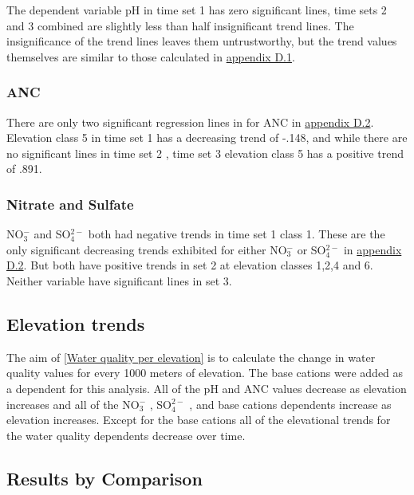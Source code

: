 The dependent variable pH in time set 1 has zero significant lines, time sets 2 and 3 combined are slightly less than half insignificant trend lines. 
The insignificance of the trend lines leaves them untrustworthy, but the trend values themselves are similar to those calculated in \hyperref[app:Step-wise Julian date]{appendix D.1}.

\subsubsection{ANC}

There are only two significant regression lines in for ANC in  \hyperref[app:time vars]{appendix D.2}. 
Elevation class 5 in time set 1 has a decreasing trend of -.148,  and while there are no significant lines in time set 2 , time set 3 elevation class 5 has a positive trend of .891.

\subsubsection{Nitrate and Sulfate}

NO$_3^-$ and SO$_4^{2-}$ both had negative trends in time set 1 class 1. 
These are the only significant decreasing trends exhibited for either NO$_3^-$ or SO$_4^{2-}$  in  \hyperref[app:time vars]{appendix D.2}.  
But both have positive trends in set 2 at elevation classes 1,2,4 and 6.
Neither variable have significant lines in set 3.

\subsection{Elevation trends}

The aim of \autoref{Water quality per elevation} is to calculate the change in water quality values for every 1000 meters of elevation.  
The base cations were added as a dependent for this analysis. 
All of the pH and ANC values decrease as elevation increases and all of the  NO$_3^-$ , SO$_4^{2-}$ , and base cations dependents increase as elevation increases. 
Except for the base cations all of the elevational trends for the water quality dependents decrease over time.

\subsection{Results by Comparison}

